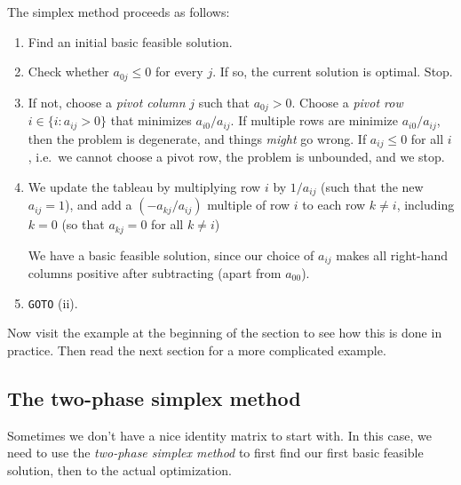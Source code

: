 \documentclass[a4paper]{article}
\begin{document}
The simplex method proceeds as follows:
\begin{enumerate}
  \item Find an initial basic feasible solution.
  \item Check whether $a_{0j} \leq 0$ for every $j$. If so, the current solution is optimal. Stop.
  \item If not, choose a \emph{pivot column} $j$ such that $a_{0j} > 0$. Choose a \emph{pivot row} $i\in \{i: a_{ij} > 0\}$ that minimizes $a_{i0}/a_{ij}$. If multiple rows are minimize $a_{i0}/a_{ij}$, then the problem is degenerate, and things \emph{might} go wrong. If $a_{ij} \leq 0$ for all $i$, i.e.\ we cannot choose a pivot row, the problem is unbounded, and we stop.
  \item We update the tableau by multiplying row $i$ by $1/a_{ij}$ (such that the new $a_{ij} = 1$), and add a $(-a_{kj}/a_{ij})$ multiple of row $i$ to each row $k \not= i$, including $k = 0$ (so that $a_{kj} = 0$ for all $k \not= i$)

    We have a basic feasible solution, since our choice of $a_{ij}$ makes all right-hand columns positive after subtracting (apart from $a_{00}$).
  \item \texttt{GOTO} (ii).
\end{enumerate}

Now visit the example at the beginning of the section to see how this is done in practice. Then read the next section for a more complicated example.
\subsection{The two-phase simplex method}
Sometimes we don't have a nice identity matrix to start with. In this case, we need to use the \emph{two-phase simplex method} to first find our first basic feasible solution, then to the actual optimization.
\end{document}
